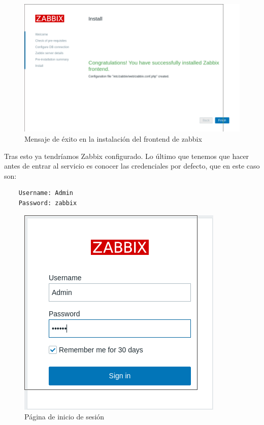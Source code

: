 \begin{figure}[H]
	\centering
	\includegraphics[scale=0.4]{graphics/img10}
	\caption{Mensaje de éxito en la instalación del frontend de zabbix}
\end{figure}

Tras esto ya tendríamos Zabbix configurado. Lo último que tenemos que hacer antes de entrar al servicio es conocer las credenciales por defecto, que en este caso son:

\begin{lstlisting}
	Username: Admin
	Password: zabbix 
\end{lstlisting}

\begin{figure}[H]
	\centering
	\includegraphics[scale=0.4]{graphics/img11}
	\caption{Página de inicio de sesión}
\end{figure}

